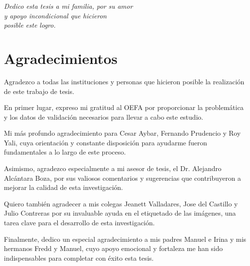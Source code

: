 \newpage
\vspace*{\fill}
\begin{flushright}
    \small{\textit{
    Dedico esta tesis a mi familia, por su amor \\ 
    y apoyo incondicional que hicieron \\
    posible este logro.}}

\end{flushright}
\vspace{1cm}
\thispagestyle{empty}

\newpage
\section*{Agradecimientos}

Agradezco a todas las instituciones y personas 
que hicieron posible la realización de este trabajo de tesis.

En primer lugar, expreso mi gratitud al OEFA por proporcionar 
la problemática y los datos de validación necesarios para llevar 
a cabo este estudio.

Mi más profundo agradecimiento para Cesar Aybar, Fernando Prudencio 
y Roy Yali, cuya orientación y constante disposición para ayudarme fueron 
fundamentales a lo largo de este proceso.

Asimismo, agradezco especialmente a mi asesor de tesis, el Dr. Alejandro 
Alcántara Boza, por sus valiosos comentarios y sugerencias que contribuyeron
a mejorar la calidad de esta investigación.

Quiero también agradecer a mis colegas Jeanett Valladares, Jose del Castillo y 
Julio Contreras por su invaluable ayuda en el etiquetado de las imágenes, una 
tarea clave para el desarrollo de esta investigación.

Finalmente, dedico un especial agradecimiento a mis padres Manuel e Irina y mis hermanos 
Fredd y Manuel, cuyo apoyo emocional y fortaleza me han sido indispensables para completar con éxito esta tesis.

\thispagestyle{empty}
\clearpage
\renewcommand{\contentsname}{
\vspace{-\baselineskip}
\begin{center}
    \large{ÍNDICE}
\end{center}
\vspace{-\baselineskip}
}
\tableofcontents
\thispagestyle{empty}

